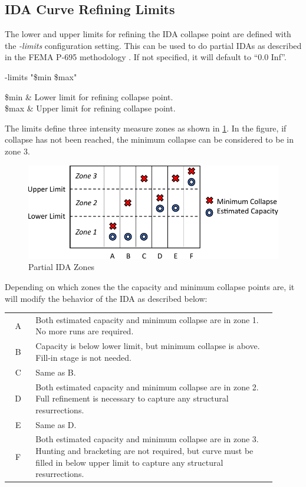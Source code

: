 \documentclass{article}
\renewcommand{\^}[1]{\textsuperscript{#1}}
\renewcommand{\_}[1]{\textsubscript{#1}}
\begin{document}
\clearpage
\subsection{IDA Curve Refining Limits}
The lower and upper limits for refining the IDA collapse point are defined with the \textit{-limits} configuration setting.
This can be used to do partial IDAs as described in the FEMA P-695 methodology \cite{fema_quantification_2009}.
If not specified, it will default to ``0.0 Inf''.
\begin{syntax}
-limits "\$min \$max"
\end{syntax}
\begin{args}
\$min & Lower limit for refining collapse point. \\
\$max & Upper limit for refining collapse point.
\end{args}

The limits define three intensity measure zones as shown in \fig\ref{fig:ida_zones}. 
In the figure, if collapse has not been reached, the minimum collapse can be considered to be in zone 3. \\

\begin{figure}[!htb]
\centering
\includegraphics{ida_zones}
\caption{Partial IDA Zones}
\label{fig:ida_zones}
\end{figure}



Depending on which zones the the capacity and minimum collapse points are, it will modify the behavior of the IDA as described below:

\begin{tabular}{cp{0.9\linewidth}}
A & Both estimated capacity and minimum collapse are in zone 1. No more runs are required. \\
B & Capacity is below lower limit, but minimum collapse is above. Fill-in stage is not needed. \\
C & Same as B.\\
D & Both estimated capacity and minimum collapse are in zone 2. Full refinement is necessary to capture any structural resurrections. \\
E & Same as D. \\
F & Both estimated capacity and minimum collapse are in zone 3. Hunting and bracketing are not required, but curve must be filled in below upper limit to capture any structural resurrections.
\end{tabular}
\clearpage
\end{document}
